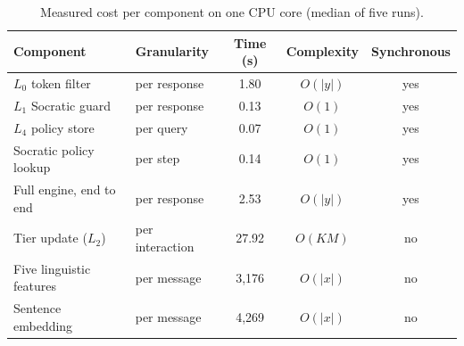 \begin{table}[H]
\caption{Measured cost per component on one CPU core (median of five runs).\label{tab:overhead}}
\small
\begin{tabularx}{\textwidth}{Llccc}
\toprule
\textbf{Component} & \textbf{Granularity} & \textbf{Time (\boldmath{$\mu$}s)} & \textbf{Complexity} & \textbf{Synchronous} \\
\midrule
$L_0$ token filter & per response & 1.80 & $O(|y|)$ & yes \\
$L_1$ Socratic guard & per response & 0.13 & $O(1)$ & yes \\
$L_4$ policy store & per query & 0.07 & $O(1)$ & yes \\
Socratic policy lookup & per step & 0.14 & $O(1)$ & yes \\
Full engine, end to end & per response & 2.53 & $O(|y|)$ & yes \\
Tier update ($L_2$) & per interaction & 27.92 & $O(KM)$ & no \\
Five linguistic features & per message & 3{,}176 & $O(|x|)$ & no \\
Sentence embedding & per message & 4{,}269 & $O(|x|)$ & no \\
\bottomrule
\end{tabularx}
\end{table}

